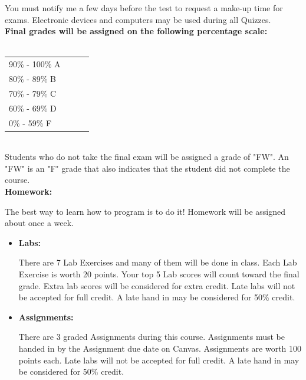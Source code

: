 \documentclass[11pt]{article}
\begin{document}
You must notify me a few days before the test to request a make-up time for exams.  Electronic devices and computers may be used during all Quizzes.\\

\textbf {\large Final grades will be assigned on the following percentage scale:} \\\\
\hspace*{40mm}
\begin{tabular}{ l l | l l }
90\% - 100\% A \\
80\% - 89\% B \\
70\% - 79\% C \\
60\% - 69\% D \\
0\% - 59\% F \\
\end{tabular} \\

Students who do not take the final exam will be assigned a grade of "FW". An "FW" is an "F" grade that also indicates that the student did not complete the course.\\


\textbf {\large Homework:}

The best way to learn how to program is to do it! Homework will be assigned
about once a week.

\begin{itemize}

	\item \textbf {Labs:}

        There are 7 Lab Exercises and many of them will be done in class. Each
        Lab Exercise is worth 20 points. Your top 5 Lab scores will count
        toward the final grade. Extra lab scores will be considered for extra
        credit. Late labs will not be accepted for full credit.  A late hand in
        may be considered for 50\% credit.

	\item \textbf {Assignments:}

        There are 3 graded Assignments during this course. Assignments must be
        handed in by the Assignment due date on Canvas. Assignments are worth
        100 points each. Late labs will not be accepted for full credit.
        A late hand in may be considered for 50\% credit.

    \end{itemize}
\end{document}
